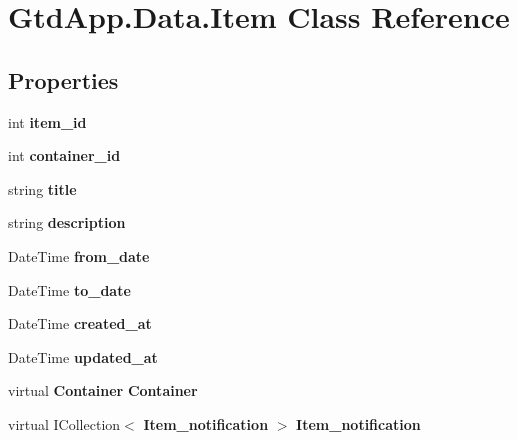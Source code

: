 \section{Gtd\+App.\+Data.\+Item Class Reference}
\label{class_gtd_app_1_1_data_1_1_item}
\subsection*{Properties}
\begin{DoxyCompactItemize}
\item 
\mbox{\label{class_gtd_app_1_1_data_1_1_item_acd5515b694950e686485d0648a22592d}} 
int {\bfseries item\+\_\+id}\hspace{0.3cm}{\ttfamily  [get, set]}
\item 
\mbox{\label{class_gtd_app_1_1_data_1_1_item_a7ff748d295806fe1c1a148bddb2f7ec8}} 
int {\bfseries container\+\_\+id}\hspace{0.3cm}{\ttfamily  [get, set]}
\item 
\mbox{\label{class_gtd_app_1_1_data_1_1_item_a593cd1ce2422e5081179168109332035}} 
string {\bfseries title}\hspace{0.3cm}{\ttfamily  [get, set]}
\item 
\mbox{\label{class_gtd_app_1_1_data_1_1_item_a849f5a83d171e7b809ff352f42af497f}} 
string {\bfseries description}\hspace{0.3cm}{\ttfamily  [get, set]}
\item 
\mbox{\label{class_gtd_app_1_1_data_1_1_item_a2a70a3b497476ced1b973b82f1de2c54}} 
Date\+Time {\bfseries from\+\_\+date}\hspace{0.3cm}{\ttfamily  [get, set]}
\item 
\mbox{\label{class_gtd_app_1_1_data_1_1_item_a318faa76c3a08dfcd77cbcd0a1f363a6}} 
Date\+Time {\bfseries to\+\_\+date}\hspace{0.3cm}{\ttfamily  [get, set]}
\item 
\mbox{\label{class_gtd_app_1_1_data_1_1_item_a3682d68c8b565a1c0ec8e0537b5dab32}} 
Date\+Time {\bfseries created\+\_\+at}\hspace{0.3cm}{\ttfamily  [get, set]}
\item 
\mbox{\label{class_gtd_app_1_1_data_1_1_item_a17d48c93d6b7ede4c1aafe4b8ff11115}} 
Date\+Time {\bfseries updated\+\_\+at}\hspace{0.3cm}{\ttfamily  [get, set]}
\item 
\mbox{\label{class_gtd_app_1_1_data_1_1_item_a2fb658ebeb443dd1329134eea906a3fc}} 
virtual \textbf{ Container} {\bfseries Container}\hspace{0.3cm}{\ttfamily  [get, set]}
\item 
\mbox{\label{class_gtd_app_1_1_data_1_1_item_a554db5e8f7f4f26ed5bdccde64280ec5}} 
virtual I\+Collection$<$ \textbf{ Item\+\_\+notification} $>$ {\bfseries Item\+\_\+notification}\hspace{0.3cm}{\ttfamily  [get, set]}
\end{DoxyCompactItemize}


